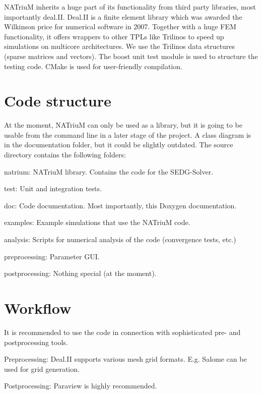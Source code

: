 N\-A\-Triu\-M inherits a huge part of its functionality from third party libraries, most importantly deal.\-I\-I. Deal.\-I\-I is a finite element library which was awarded the Wilkinson price for numerical software in 2007. Together with a huge F\-E\-M functionality, it offers wrappers to other T\-P\-Ls like Trilinos to speed up simulations on multicore architectures. We use the Trilinos data structures (sparse matrices and vectors). The boost unit test module is used to structure the testing code. C\-Make is used for user-\/friendly compilation.\hypertarget{index_struct_sec}{}\section{Code structure}\label{index_struct_sec}
At the moment, N\-A\-Triu\-M can only be used as a library, but it is going to be usable from the command line in a later stage of the project. A class diagram is in the documentation folder, but it could be slightly outdated. The source directory contains the following folders\-:
\begin{DoxyItemize}
\item natrium\-: N\-A\-Triu\-M library. Contains the code for the S\-E\-D\-G-\/\-Solver.
\item test\-: Unit and integration tests.
\item doc\-: Code documentation. Most importantly, this Doxygen documentation.
\item examples\-: Example simulations that use the N\-A\-Triu\-M code.
\item analysis\-: Scripts for numerical analysis of the code (convergence tests, etc.)
\item preprocessing\-: Parameter G\-U\-I.
\item postprocessing\-: Nothing special (at the moment).
\end{DoxyItemize}\hypertarget{index_workflow_sec}{}\section{Workflow}\label{index_workflow_sec}
It is recommended to use the code in connection with sophisticated pre-\/ and postprocessing tools.
\begin{DoxyItemize}
\item Preprocessing\-: Deal.\-I\-I supports various mesh grid formats. E.\-g. Salome can be used for grid generation.
\item Postprocessing\-: Paraview is highly recommended.
\end{DoxyItemize}

